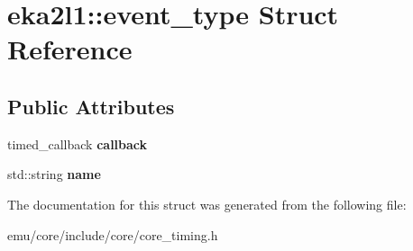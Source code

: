 \hypertarget{structeka2l1_1_1event__type}{}\section{eka2l1\+:\+:event\+\_\+type Struct Reference}
\label{structeka2l1_1_1event__type}
\subsection*{Public Attributes}
\begin{DoxyCompactItemize}
\item 
\mbox{\label{structeka2l1_1_1event__type_a8c16214f06cada22b6fc2f26ad5eea99}} 
timed\+\_\+callback {\bfseries callback}
\item 
\mbox{\label{structeka2l1_1_1event__type_a19c80ff44dff1a2bfca088d466f5f6f6}} 
std\+::string {\bfseries name}
\end{DoxyCompactItemize}


The documentation for this struct was generated from the following file\+:\begin{DoxyCompactItemize}
\item 
emu/core/include/core/core\+\_\+timing.\+h\end{DoxyCompactItemize}
